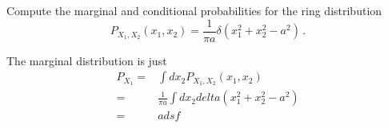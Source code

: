 

Compute the marginal and conditional probabilities for the ring distribution
\begin{equation*}
P_{X_1, X_2}(x_1, x_2) = \frac{1}{\pi a} \delta (x_1^2 + x_2^2 - a^2) \, .
\end{equation*}


The marginal distribution is just
\begin{align*}
P_{X_1}
=& \int d x_2 P_{X_1, X_2}(x_1, x_2) \\
=& \frac{1}{\pi a} \int d x_2 delta(x_1^2 + x_2^2 - a^2) \\
=& adsf
\end{align*}
